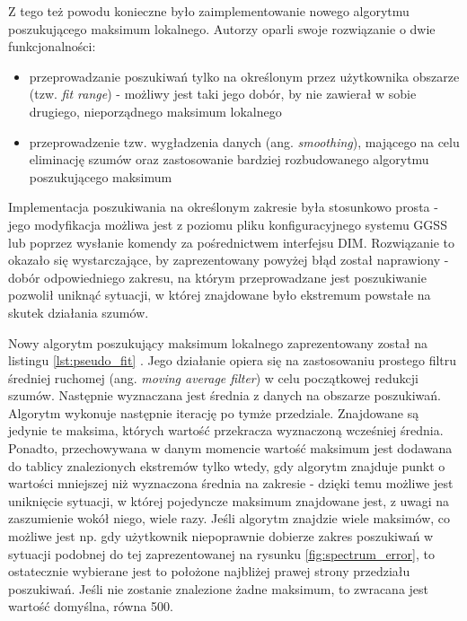 Z tego też powodu konieczne było zaimplementowanie nowego algorytmu poszukującego maksimum lokalnego. Autorzy oparli swoje rozwiązanie o dwie funkcjonalności: 
\begin{itemize}
    \item przeprowadzanie poszukiwań tylko na określonym przez użytkownika obszarze (tzw. \emph{fit range}) - możliwy jest taki jego dobór, by nie zawierał w sobie drugiego, nieporządnego maksimum lokalnego
    \item przeprowadzenie tzw. wygładzenia danych (ang. \emph{smoothing}), mającego na celu eliminację szumów oraz zastosowanie bardziej rozbudowanego algorytmu poszukującego maksimum
\end{itemize}

Implementacja poszukiwania na określonym zakresie była stosunkowo prosta - jego modyfikacja możliwa jest z poziomu pliku konfiguracyjnego systemu GGSS lub poprzez wysłanie komendy za pośrednictwem interfejsu DIM. Rozwiązanie to okazało się wystarczające, by zaprezentowany powyżej błąd został naprawiony - dobór odpowiedniego zakresu, na którym przeprowadzane jest poszukiwanie pozwolił uniknąć sytuacji, w której znajdowane było ekstremum powstałe na skutek działania szumów. 

Nowy algorytm poszukujący maksimum lokalnego zaprezentowany został na listingu \ref{lst:pseudo_fit} \cite{baeldung_fit}. Jego działanie opiera się na zastosowaniu prostego filtru średniej ruchomej (ang. \emph{moving average filter}) w celu początkowej redukcji szumów. Następnie wyznaczana jest średnia z danych na obszarze poszukiwań. Algorytm wykonuje następnie iterację po tymże przedziale. Znajdowane są jedynie te maksima, których wartość przekracza wyznaczoną wcześniej średnia. Ponadto, przechowywana w danym momencie wartość maksimum jest dodawana do tablicy znalezionych ekstremów tylko wtedy, gdy algorytm znajduje punkt o wartości mniejszej niż wyznaczona średnia na zakresie - dzięki temu możliwe jest uniknięcie sytuacji, w której pojedyncze maksimum znajdowane jest, z uwagi na zaszumienie wokół niego, wiele razy. Jeśli algorytm znajdzie wiele maksimów, co możliwe jest np. gdy użytkownik niepoprawnie dobierze zakres poszukiwań w sytuacji podobnej do tej zaprezentowanej na rysunku \ref{fig:spectrum_error}, to ostatecznie wybierane jest to położone najbliżej prawej strony przedziału poszukiwań. Jeśli nie zostanie znalezione żadne maksimum, to zwracana jest wartość domyślna, równa 500. 

